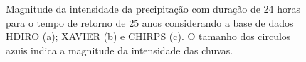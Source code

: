 \documentclass[
]{agujournal2019}
\begin{document}
\begin{figure}
\begin{minipage}{\linewidth}
{}


\end{minipage}%
\newline
\begin{minipage}{\linewidth}



\end{minipage}%

\caption{\label{fig-Figura5}Magnitude da intensidade da precipitação com
duração de 24 horas para o tempo de retorno de 25 anos considerando a
base de dados HDIRO (a); XAVIER (b) e CHIRPS (c). O tamanho dos circulos
azuis indica a magnitude da intensidade das chuvas.}

\end{figure}%
\end{document}
